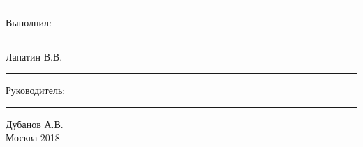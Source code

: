 \begin{titlepage}
\begin{center}




 \rule[+0mm]{4.0cm}{0.0mm}\huge{Выполнил}:  \rule[+0mm]{1.7cm}{0.0mm} \huge{Лапатин В.В.}\\
 \rule[+0mm]{4.0cm}{0.0mm}\huge{Руководитель}:  \rule[+0mm]{0.2cm}{0.0mm} \huge{Дубанов А.В.}\\[3.5cm]



\large{Москва 2018}
\end{center}
\thispagestyle{empty} %
\end{titlepage} %